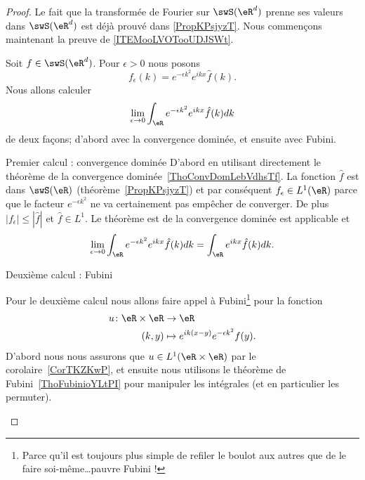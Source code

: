 \begin{proof}
	Le fait que la transformée de Fourier sur \( \swS(\eR^d)\) prenne ses valeurs dans \( \swS(\eR^d)\) est déjà prouvé dans \ref{PropKPsjyzT}. Nous commençons maintenant la preuve de \ref{ITEMooLVOTooUDJSWt}.

	Soit \( f\in \swS(\eR^d)\). Pour \( \epsilon>0\) nous posons
	\begin{equation}
		f_{\epsilon}(k)= e^{-\epsilon k^2} e^{ikx}\hat f(k).
	\end{equation}
	Nous allons calculer
	\begin{equation}
		\lim_{\epsilon\to 0}\int_{\eR} e^{-\epsilon k^2} e^{ikx}\hat f(k)dk
	\end{equation}
	de deux façons; d'abord avec la convergence dominée, et ensuite avec Fubini.

	\begin{subproof}
		\item[Premier calcul : convergence dominée]
		D'abord en utilisant directement le théorème de la convergence dominée~\ref{ThoConvDomLebVdhsTf}. La fonction \( \hat f\) est dans \( \swS(\eR)\) (théorème~\ref{PropKPsjyzT}) et par conséquent \( f_{\epsilon}\in L^1(\eR)\) parce que le facteur \(  e^{-\epsilon k^2}\) ne va certainement pas empêcher de converger. De plus \( | f_{\epsilon} |\leq | \hat f |\) et \( \hat f\in L^1\). Le théorème est de la convergence dominée est applicable et
		\begin{equation}        \label{EQooYIYGooXYubbW}
			\lim_{\epsilon\to 0}\int_{\eR} e^{-\epsilon k^2} e^{ikx}\hat f(k)dk=\int_{\eR} e^{ikx}\hat f(k)dk.
		\end{equation}

		\item[Deuxième calcul : Fubini]

		Pour le deuxième calcul nous allons faire appel à Fubini\footnote{Parce qu'il est toujours plus simple de refiler le boulot aux autres que de le faire soi-même\ldots pauvre Fubini !} pour la fonction
		\begin{equation}
			\begin{aligned}
				u\colon \eR\times \eR & \to \eR                                     \\
				(k,y)                 & \mapsto  e^{ik(x-y)} e^{-\epsilon k^2}f(y).
			\end{aligned}
		\end{equation}
		D'abord nous nous assurons que \( u\in L^1(\eR\times \eR)\) par le corolaire~\ref{CorTKZKwP}, et ensuite nous utilisons le théorème de Fubini~\ref{ThoFubinioYLtPI} pour manipuler les intégrales (et en particulier les permuter).


\end{subproof}
\end{proof}
